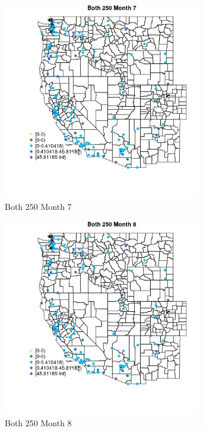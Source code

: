 \begin{figure} 
\centering  
\includegraphics[width=0.77\textwidth]{Code_Outputs/Report_ML_input_PM25_Step4_part_e_de_duplicated_aves_MapObsMo7Both_250.jpg} 
\caption{\label{fig:Report_ML_input_PM25_Step4_part_e_de_duplicated_avesMapObsMo7Both_250}Both 250 Month 7} 
\end{figure} 
 

\clearpage 

\begin{figure} 
\centering  
\includegraphics[width=0.77\textwidth]{Code_Outputs/Report_ML_input_PM25_Step4_part_e_de_duplicated_aves_MapObsMo8Both_250.jpg} 
\caption{\label{fig:Report_ML_input_PM25_Step4_part_e_de_duplicated_avesMapObsMo8Both_250}Both 250 Month 8} 
\end{figure} 
 

